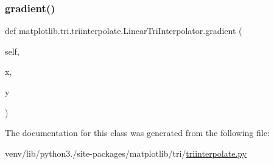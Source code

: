 \subsubsection{\texorpdfstring{gradient()}{gradient()}}
{\footnotesize\ttfamily def matplotlib.\+tri.\+triinterpolate.\+Linear\+Tri\+Interpolator.\+gradient (\begin{DoxyParamCaption}\item[{}]{self,  }\item[{}]{x,  }\item[{}]{y }\end{DoxyParamCaption})}



The documentation for this class was generated from the following file\+:\begin{DoxyCompactItemize}
\item 
venv/lib/python3./site-\/packages/matplotlib/tri/\hyperlink{triinterpolate_8py}{triinterpolate.\+py}\end{DoxyCompactItemize}
